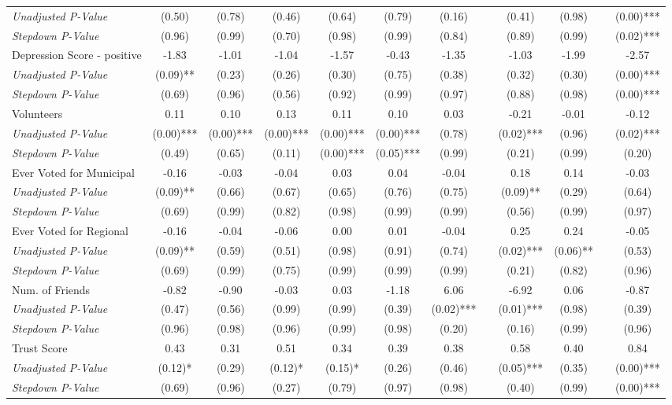 \begin{tabular}{l c c c c c c c c c c c}
\quad \textit{Unadjusted P-Value} & (0.50) & (0.78) & (0.46) & (0.64) & (0.79) & (0.16) & & (0.41) & (0.98) & & (0.00)*** \\
\quad \textit{Stepdown P-Value} & (0.96) & (0.99) & (0.70) & (0.98) & (0.99) & (0.84) & & (0.89) & (0.99) & & (0.02)*** \\
Depression Score - positive & -1.83 & -1.01 & -1.04 & -1.57 & -0.43 & -1.35 & & -1.03 & -1.99 & & -2.57 \\
\quad \textit{Unadjusted P-Value} & (0.09)** & (0.23) & (0.26) & (0.30) & (0.75) & (0.38) & & (0.32) & (0.30) & & (0.00)*** \\
\quad \textit{Stepdown P-Value} & (0.69) & (0.96) & (0.56) & (0.92) & (0.99) & (0.97) & & (0.88) & (0.98) & & (0.00)*** \\
Volunteers & 0.11 & 0.10 & 0.13 & 0.11 & 0.10 & 0.03 & & -0.21 & -0.01 & & -0.12 \\
\quad \textit{Unadjusted P-Value} & (0.00)*** & (0.00)*** & (0.00)*** & (0.00)*** & (0.00)*** & (0.78) & & (0.02)*** & (0.96) & & (0.02)*** \\
\quad \textit{Stepdown P-Value} & (0.49) & (0.65) & (0.11) & (0.00)*** & (0.05)*** & (0.99) & & (0.21) & (0.99) & & (0.20) \\
Ever Voted for Municipal & -0.16 & -0.03 & -0.04 & 0.03 & 0.04 & -0.04 & & 0.18 & 0.14 & & -0.03 \\
\quad \textit{Unadjusted P-Value} & (0.09)** & (0.66) & (0.67) & (0.65) & (0.76) & (0.75) & & (0.09)** & (0.29) & & (0.64) \\
\quad \textit{Stepdown P-Value} & (0.69) & (0.99) & (0.82) & (0.98) & (0.99) & (0.99) & & (0.56) & (0.99) & & (0.97) \\
Ever Voted for Regional & -0.16 & -0.04 & -0.06 & 0.00 & 0.01 & -0.04 & & 0.25 & 0.24 & & -0.05 \\
\quad \textit{Unadjusted P-Value} & (0.09)** & (0.59) & (0.51) & (0.98) & (0.91) & (0.74) & & (0.02)*** & (0.06)** & & (0.53) \\
\quad \textit{Stepdown P-Value} & (0.69) & (0.99) & (0.75) & (0.99) & (0.99) & (0.99) & & (0.21) & (0.82) & & (0.96) \\
Num. of Friends & -0.82 & -0.90 & -0.03 & 0.03 & -1.18 & 6.06 & & -6.92 & 0.06 & & -0.87 \\
\quad \textit{Unadjusted P-Value} & (0.47) & (0.56) & (0.99) & (0.99) & (0.39) & (0.02)*** & & (0.01)*** & (0.98) & & (0.39) \\
\quad \textit{Stepdown P-Value} & (0.96) & (0.98) & (0.96) & (0.99) & (0.98) & (0.20) & & (0.16) & (0.99) & & (0.96) \\
Trust Score & 0.43 & 0.31 & 0.51 & 0.34 & 0.39 & 0.38 & & 0.58 & 0.40 & & 0.84 \\
\quad \textit{Unadjusted P-Value} & (0.12)* & (0.29) & (0.12)* & (0.15)* & (0.26) & (0.46) & & (0.05)*** & (0.35) & & (0.00)*** \\
\quad \textit{Stepdown P-Value} & (0.69) & (0.96) & (0.27) & (0.79) & (0.97) & (0.98) & & (0.40) & (0.99) & & (0.00)*** \\
\bottomrule
\end{tabular}
